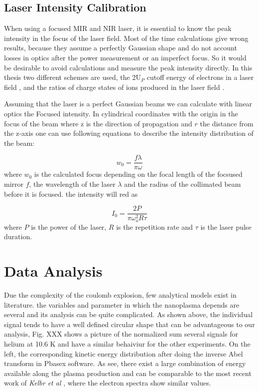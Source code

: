 \subsection{Laser Intensity Calibration}
When using a focused MIR and NIR laser, it is essential to know the peak intensity in the focus of the laser field. Most of the time calculations give wrong results, because they assume a perfectly Gaussian shape and do not account losses in optics after the power measurement or an imperfect focus. So it would be desirable to avoid calculations and measure the peak intensity directly. In this thesis two different schemes are used, the 2U$_P$ cutoff energy of electrons in a laser field \cite{Becker_2018}, \cite{becker_vuv_1996} and the ratios of charge states of ions produced in the laser field \cite{augst_laser_1991}.

Assuming that the laser is a perfect Gaussian beams we can calculate with linear optics the Focused intensity. In cylindrical coordinates with the origin in the focus of the beam where z is the direction of propagation and $r$ the distance from the z-axis one can use following equations to describe the intensity distribution of the beam:

\begin{equation}
w_{0}=\dfrac{f\lambda}{\pi \omega}
\end{equation}
 where $w_{0}$ is the calculated focus depending on the focal length of the focsused mirror $f$, the wavelength of the laser $\lambda$ and the radius of the collimated beam before it is focused.
the intensity will red as

\begin{equation}
I_{0}=\dfrac{2P}{\pi \omega_{o}^{2}R \tau}
\end{equation} 
 where $P$
is the power of the laser, $R$ is the repetition rate and $\tau$ is the laser pulse duration.




\section{Data Analysis}

Due the complexity of the coulomb explosion, few analytical models exist in literature. the variables and parameter in which the nanoplasma depends are several and its analysis can be quite complicated. As shown above, the individual signal tends to have a well defined circular shape that can be advantageous to our analysis, Fig.  XXX shows a picture of the normalized sum several signals for helium at 10.6 K and have a similar behaiviur for the other experiments. On the left, the corresponding kinetic energy  distribution after doing the inverse Abel transform in Pbasex software. As see, there  exist a large combination of energy available along the plasma production and  can be comparable to the most recent work of \textit{Kelbr et al} \cite{kelbg_auger_2019}, where the electron spectra show  similar values.

